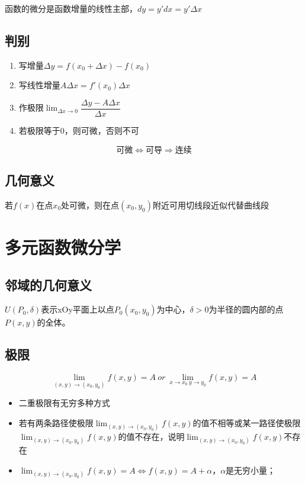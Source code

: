 函数的微分是函数增量的线性主部，\(dy = y'dx = y'\Delta x\)


\subsection{判别}
\begin{enumerate}
    \item 写增量\(\Delta y = f(x_0 + \Delta x) - f(x_0)\)
    \item 写线性增量\(A\Delta x = f'(x_0)\Delta x\)
    \item 作极限\(\displaystyle \lim_{\Delta x \to 0}\dfrac{\Delta y - A\Delta x}{\Delta x}\)
    \item 若极限等于0，则可微，否则不可
\end{enumerate}
\[\text{可微} \Leftrightarrow \text{可导} \Rightarrow \text{连续}\]


\subsection{几何意义}

若\(f(x)\)在点\(x_0\)处可微，则在点\((x_0, y_0)\)附近可用切线段近似代替曲线段


\section{多元函数微分学}

\subsection{邻域的几何意义}
\(U(P_0, \delta)\)表示xOy平面上以点\(P_0(x_0, y_0)\)为中心，\(\delta > 0\)为半径的圆内部的点\(P(x, y)\)的全体。

\subsection{极限}
\[\lim_{(x, y) \to (x_0, y_0)}f(x, y) = A\ or\ \lim_{x\to x_0\ y \to y_0}f(x, y) = A\]

\begin{itemize}
    \item 二重极限有无穷多种方式
    \item 若有两条路径使极限\(\displaystyle\lim_{(x, y) \to (x_0, y_0)}f(x, y)\)的值不相等或某一路径使极限\(\displaystyle\lim_{(x, y) \to (x_0, y_0)}f(x, y)\)的值不存在，说明\(\displaystyle\lim_{(x, y) \to (x_0, y_0)}f(x, y)\)不存在
    \item \(\displaystyle\lim_{(x, y) \to (x_0, y_0)}f(x, y) = A \Leftrightarrow f(x, y) = A + \alpha\)，\(\alpha\)是无穷小量；
\end{itemize}


